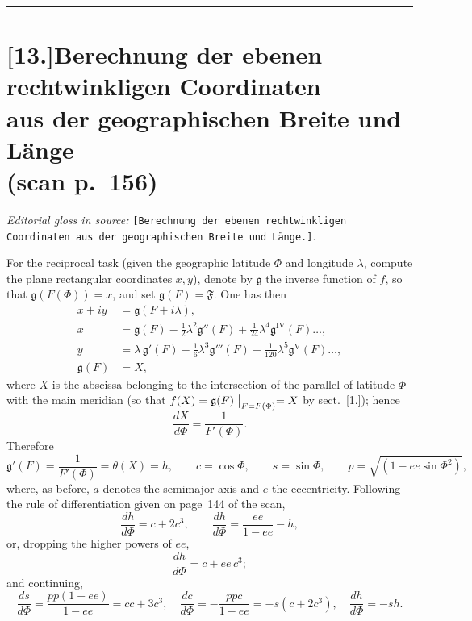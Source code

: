 \documentclass[12pt,a4paper]{article}
\begin{document}
\bigskip
\hrule
\bigskip

\section*{[13.]\quad Berechnung der ebenen rechtwinkligen Coordinaten\\aus
der geographischen Breite und L\"ange\\(scan p.~156)}

\textit{Editorial gloss in source:} \texttt{[Berechnung der ebenen
rechtwinkligen Coordinaten aus der geographischen Breite und L\"ange.]}.

For the reciprocal task (given the geographic latitude $\Phi$ and
longitude $\lambda$, compute the plane rectangular coordinates $x,y$),
denote by $\mathfrak{g}$ the inverse function of $f$, so that
$\mathfrak{g}(F(\Phi)) = x$, and set $\mathfrak{g}(F)=\mathfrak{F}$.
One has then
\begin{align*}
   x + iy &= \mathfrak{g}(F+i\lambda),\\
   x &= \mathfrak{g}(F) - \tfrac{1}{2}\lambda^{2}\mathfrak{g}''(F)
        + \tfrac{1}{24}\lambda^{4}\mathfrak{g}^{\mathrm{IV}}(F)\ldots,\\
   y &= \lambda\,\mathfrak{g}'(F) - \tfrac{1}{6}\lambda^{3}\mathfrak{g}'''(F)
        + \tfrac{1}{120}\lambda^{5}\mathfrak{g}^{\mathrm{V}}(F)\ldots,\\
   \mathfrak{g}(F) &= X,
\end{align*}
where $X$ is the abscissa belonging to the intersection of the
parallel of latitude $\Phi$ with the main meridian (so that
$f(X) = \mathfrak{g}(F)\bigm|_{F=F(\Phi)}=X$ by sect.~[1.]); hence
\[
   \frac{dX}{d\Phi} = \frac{1}{F'(\Phi)}.
\]
Therefore
\[
   \mathfrak{g}'(F) = \frac{1}{F'(\Phi)} = \theta(X)=h,
   \qquad c = \cos\Phi,\qquad s = \sin\Phi,
   \qquad p = \sqrt{(1-ee\sin\Phi^{2})},
\]
where, as before, $a$ denotes the semimajor axis and $e$ the
eccentricity. Following the rule of differentiation given on
page~144 of the scan,
\[
   \frac{dh}{d\Phi} = c + 2c^{3},\qquad
   \frac{dh}{d\Phi} = \frac{ee}{1-ee}-h,
\]
or, dropping the higher powers of $ee$,
\[
   \frac{dh}{d\Phi} = c + ee\,c^{3};
\]
and continuing,
\[
   \frac{ds}{d\Phi} = \frac{pp(1-ee)}{1-ee} = cc + 3c^{3},
   \quad
   \frac{dc}{d\Phi} = -\frac{ppc}{1-ee} = -s(c+2c^{3}),
   \quad
   \frac{dh}{d\Phi} = -sh.
\]
\end{document}
